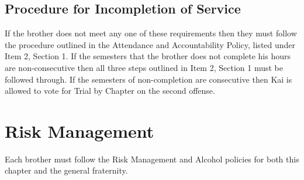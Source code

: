 \subsection{Procedure for Incompletion of Service}
If the brother does not meet any one of these requirements then they must follow the procedure outlined in the Attendance and Accountability Policy, listed under Item 2, Section 1.
If the semesters that the brother does not complete his hours are non-consecutive then all three steps outlined in Item 2, Section 1 must be followed through.
If the semesters of non-completion are consecutive then Kai is allowed to vote for Trial by Chapter on the second offense.

\section{Risk Management}
Each brother must follow the Risk Management and Alcohol policies for both this chapter and the general fraternity.

